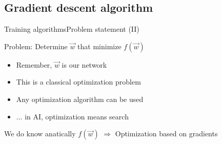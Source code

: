 \documentclass[10pt,compress]{beamer} %
\begin{document}
\subsection{Gradient descent algorithm}
\begin{frame}{Training algorithms}{Problem statement (II)}

		Problem: Determine $\vec{w}$ that minimize $f(\vec{w})$
		\begin{itemize}
			\item Remember, $\vec{w}$ is our network
			\item This is a classical optimization problem
			\item Any optimization algorithm can be used
			\item ... in AI, optimization means search
		\end{itemize}
		We do know anatically $f(\vec{w})$ $\Rightarrow$ Optimization based on gradients
\end{frame}
\end{document}
